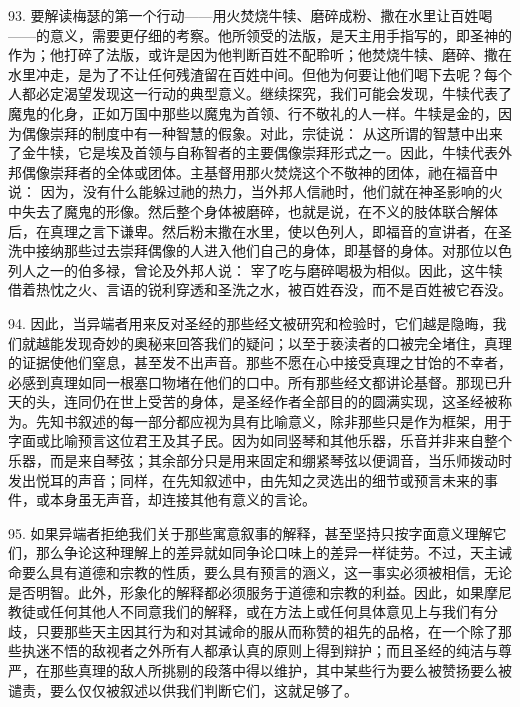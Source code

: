 93. 要解读梅瑟的第一个行动——用火焚烧牛犊、磨碎成粉、撒在水里让百姓喝——的意义，需要更仔细的考察。他所领受的法版，是天主用手指写的，即圣神的作为；他打碎了法版，或许是因为他判断百姓不配聆听；他焚烧牛犊、磨碎、撒在水里冲走，是为了不让任何残渣留在百姓中间。但他为何要让他们喝下去呢？每个人都必定渴望发现这一行动的典型意义。继续探究，我们可能会发现，牛犊代表了魔鬼的化身，正如万国中那些以魔鬼为首领、行不敬礼的人一样。牛犊是金的，因为偶像崇拜的制度中有一种智慧的假象。对此，宗徒说： 从这所谓的智慧中出来了金牛犊，它是埃及首领与自称智者的主要偶像崇拜形式之一。因此，牛犊代表外邦偶像崇拜者的全体或团体。主基督用那火焚烧这个不敬神的团体，祂在福音中说： 因为，没有什么能躲过祂的热力，当外邦人信祂时，他们就在神圣影响的火中失去了魔鬼的形像。然后整个身体被磨碎，也就是说，在不义的肢体联合解体后，在真理之言下谦卑。然后粉末撒在水里，使以色列人，即福音的宣讲者，在圣洗中接纳那些过去崇拜偶像的人进入他们自己的身体，即基督的身体。对那位以色列人之一的伯多禄，曾论及外邦人说： 宰了吃与磨碎喝极为相似。因此，这牛犊借着热忱之火、言语的锐利穿透和圣洗之水，被百姓吞没，而不是百姓被它吞没。\par

94. 因此，当异端者用来反对圣经的那些经文被研究和检验时，它们越是隐晦，我们就越能发现奇妙的奥秘来回答我们的疑问；以至于亵渎者的口被完全堵住，真理的证据使他们窒息，甚至发不出声音。那些不愿在心中接受真理之甘饴的不幸者，必感到真理如同一根塞口物堵在他们的口中。所有那些经文都讲论基督。那现已升天的头，连同仍在世上受苦的身体，是圣经作者全部目的的圆满实现，这圣经被称为。先知书叙述的每一部分都应视为具有比喻意义，除非那些只是作为框架，用于字面或比喻预言这位君王及其子民。因为如同竖琴和其他乐器，乐音并非来自整个乐器，而是来自琴弦；其余部分只是用来固定和绷紧琴弦以便调音，当乐师拨动时发出悦耳的声音；同样，在先知叙述中，由先知之灵选出的细节或预言未来的事件，或本身虽无声音，却连接其他有意义的言论。\par

95. 如果异端者拒绝我们关于那些寓意叙事的解释，甚至坚持只按字面意义理解它们，那么争论这种理解上的差异就如同争论口味上的差异一样徒劳。不过，天主诫命要么具有道德和宗教的性质，要么具有预言的涵义，这一事实必须被相信，无论是否明智。此外，形象化的解释都必须服务于道德和宗教的利益。因此，如果摩尼教徒或任何其他人不同意我们的解释，或在方法上或任何具体意见上与我们有分歧，只要那些天主因其行为和对其诫命的服从而称赞的祖先的品格，在一个除了那些执迷不悟的敌视者之外所有人都承认真的原则上得到辩护；而且圣经的纯洁与尊严，在那些真理的敌人所挑剔的段落中得以维护，其中某些行为要么被赞扬要么被谴责，要么仅仅被叙述以供我们判断它们，这就足够了。\par

